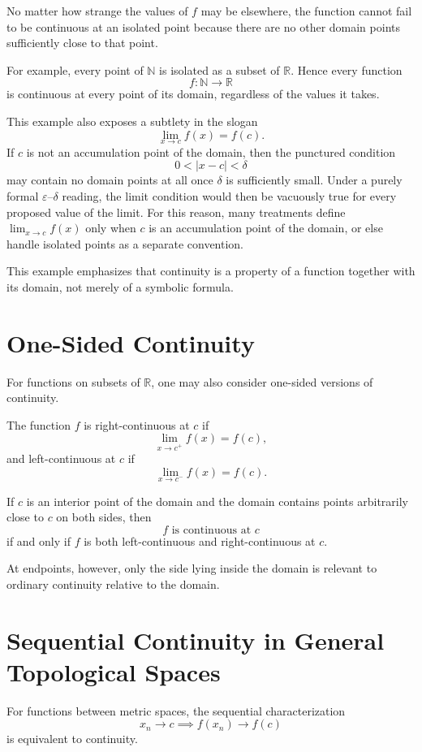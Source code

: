 \documentclass{essay}
\begin{document}
No matter how strange the values of \(f\) may be elsewhere, the function cannot fail to be continuous at an isolated point because there are no other domain points sufficiently close to that point.

For example, every point of \(\mathbb{N}\) is isolated as a subset of \(\mathbb{R}\). Hence every function
\[ f:\mathbb{N}\to\mathbb{R} \]
is continuous at every point of its domain, regardless of the values it takes.

This example also exposes a subtlety in the slogan
\[ \lim_{x\to c}f(x)=f(c). \]
If \(c\) is not an accumulation point of the domain, then the punctured condition
\[ 0<|x-c|<\delta \]
may contain no domain points at all once \(\delta\) is sufficiently small. Under a purely formal \(\varepsilon\)--\(\delta\) reading, the limit condition would then be vacuously true for every proposed value of the limit. For this reason, many treatments define \(\lim_{x\to c}f(x)\) only when \(c\) is an accumulation point of the domain, or else handle isolated points as a separate convention.

This example emphasizes that continuity is a property of a function together with its domain, not merely of a symbolic formula.

\section{One-Sided Continuity}

For functions on subsets of \(\mathbb{R}\), one may also consider one-sided versions of continuity.

The function \(f\) is right-continuous at \(c\) if
\[ \lim_{x\to c^+}f(x)=f(c), \]
and left-continuous at \(c\) if
\[ \lim_{x\to c^-}f(x)=f(c). \]

If \(c\) is an interior point of the domain and the domain contains points arbitrarily close to \(c\) on both sides, then
\[ f\text{ is continuous at }c \]
if and only if \(f\) is both left-continuous and right-continuous at \(c\).

At endpoints, however, only the side lying inside the domain is relevant to ordinary continuity relative to the domain.

\section{Sequential Continuity in General Topological Spaces}

For functions between metric spaces, the sequential characterization
\[ x_{n}\to c \implies f(x_{n})\to f(c) \]
is equivalent to continuity.
\end{document}
